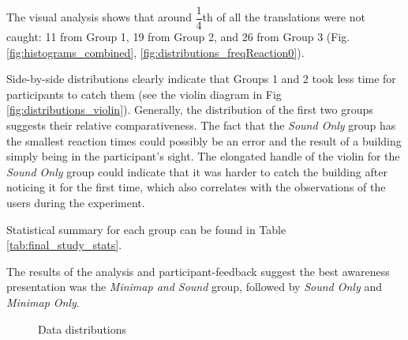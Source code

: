 The visual analysis shows that around $ \dfrac{1}{4} $th of all the translations were not caught: 11 from Group 1, 19 from Group 2, and 26 from Group 3 (Fig. \ref{fig:histograms_combined}, \ref{fig:distributions_freqReaction0}).

Side-by-side distributions clearly indicate that Groups 1 and 2 took less time for participants to catch them (see the violin diagram in Fig \ref{fig:distributions_violin}). Generally, the distribution of the first two groups suggests their relative comparativeness. The fact that the \textit{Sound Only} group has the smallest reaction times could possibly be an error and the result of a building simply being in the participant's sight. The elongated handle of the violin for the \textit{Sound Only} group could indicate that it was harder to catch the building after noticing it for the first time, which also correlates with the observations of the users during the experiment.

Statistical summary for each group can be found in Table \ref{tab:final_study_stats}.

The results of the analysis and participant-feedback suggest the best awareness presentation was the \textit{Minimap and Sound} group, followed by \textit{Sound Only} and \textit{Minimap Only}.

\begin{figure}
	\centering
	
	

	
	
	\par \smallskip
	
	\caption{Data distributions}
	\label{fig:histograms}
\end{figure}
	
